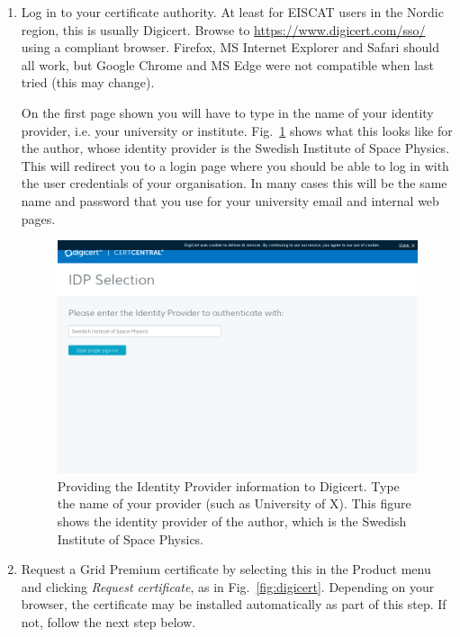 \documentclass[a4paper]{article}
\begin{document}
\begin{enumerate}


\item Log in to your certificate authority. At least for EISCAT users
  in the Nordic region, this is usually Digicert. Browse to
  \url{https://www.digicert.com/sso/} using a compliant
  browser. Firefox, MS Internet Explorer and Safari should all work,
  but Google Chrome and MS Edge were not compatible when last tried
  (this may change).

  On the first page shown you will have to type in the name of your
  identity provider, i.e. your university or
  institute. Fig.~\ref{fig:idp} shows what this looks like for the
  author, whose identity provider is the Swedish Institute of Space
  Physics. This will redirect you to a login page where you should be
  able to log in with the user credentials of your organisation. In
  many cases this will be the same name and password that you use for
  your university email and internal web pages.

  \begin{figure}[htb]
    \centering
    \includegraphics[width=1.0\linewidth]{idp-provider}
    \caption{Providing the Identity Provider information to Digicert. Type the name of your provider (such as University of X). This figure shows the identity provider of the author, which is the Swedish Institute of Space Physics.}
    \label{fig:idp}
  \end{figure}

\item Request a Grid Premium certificate by selecting this in the
  Product menu and clicking \emph{Request certificate}, as in
  Fig.~\ref{fig:digicert}.  Depending on your browser, the certificate
  may be installed automatically as part of this step. If not, follow
  the next step below.


\end{enumerate}
\end{document}
